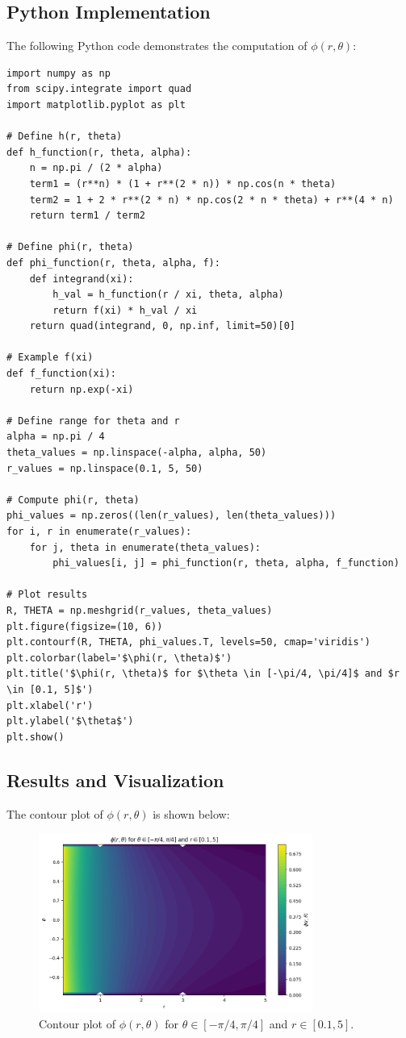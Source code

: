 \documentclass[a4paper, 12pt]{article}
\begin{document}
\subsection{Python Implementation}
The following Python code demonstrates the computation of $\phi(r, \theta)$:
\begin{verbatim}
import numpy as np
from scipy.integrate import quad
import matplotlib.pyplot as plt

# Define h(r, theta)
def h_function(r, theta, alpha):
    n = np.pi / (2 * alpha)
    term1 = (r**n) * (1 + r**(2 * n)) * np.cos(n * theta)
    term2 = 1 + 2 * r**(2 * n) * np.cos(2 * n * theta) + r**(4 * n)
    return term1 / term2

# Define phi(r, theta)
def phi_function(r, theta, alpha, f):
    def integrand(xi):
        h_val = h_function(r / xi, theta, alpha)
        return f(xi) * h_val / xi
    return quad(integrand, 0, np.inf, limit=50)[0]

# Example f(xi)
def f_function(xi):
    return np.exp(-xi)

# Define range for theta and r
alpha = np.pi / 4
theta_values = np.linspace(-alpha, alpha, 50)
r_values = np.linspace(0.1, 5, 50)

# Compute phi(r, theta)
phi_values = np.zeros((len(r_values), len(theta_values)))
for i, r in enumerate(r_values):
    for j, theta in enumerate(theta_values):
        phi_values[i, j] = phi_function(r, theta, alpha, f_function)

# Plot results
R, THETA = np.meshgrid(r_values, theta_values)
plt.figure(figsize=(10, 6))
plt.contourf(R, THETA, phi_values.T, levels=50, cmap='viridis')
plt.colorbar(label='$\phi(r, \theta)$')
plt.title('$\phi(r, \theta)$ for $\theta \in [-\pi/4, \pi/4]$ and $r \in [0.1, 5]$')
plt.xlabel('r')
plt.ylabel('$\theta$')
plt.show()
\end{verbatim}

\subsection{Results and Visualization}
The contour plot of $\phi(r, \theta)$ is shown below:

\begin{figure}[H]
    \centering
    \includegraphics[width=0.8\textwidth]{Phi.png}
    \caption{Contour plot of $\phi(r, \theta)$ for $\theta \in [-\pi/4, \pi/4]$ and $r \in [0.1, 5]$.}
    \label{fig:phi_contour}
\end{figure}
\end{document}
